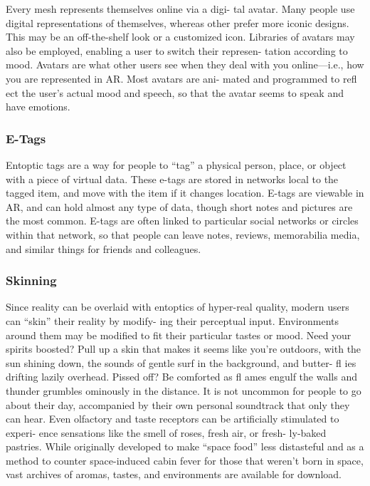 Every mesh represents themselves online via a digi-
tal avatar. Many people use digital representations 
of themselves, whereas other prefer more iconic 
designs. This may be an off-the-shelf look or a 
customized icon. Libraries of avatars may also be 
employed, enabling a user to switch their represen-
tation according to mood. Avatars are what other 
users see when they deal with you online—i.e., how 
you are represented in AR. Most avatars are ani-
mated and programmed to refl ect the user's actual 
mood and speech, so that the avatar seems to speak 
and have emotions.

\subsubsection{E-Tags}

Entoptic tags are a way for people to ``tag'' a physical 
person, place, or object with a piece of virtual data. 
These e-tags are stored in networks local to the tagged 
item, and move with the item if it changes location. 
E-tags are viewable in AR, and can hold almost any 
type of data, though short notes and pictures are the 
most common. E-tags are often linked to particular 
social networks or circles within that network, so that 
people can leave notes, reviews, memorabilia media, 
and similar things for friends and colleagues.

\subsubsection{Skinning}

Since reality can be overlaid with entoptics of hyper-real 
quality, modern users can ``skin'' their reality by modify-
ing their perceptual input. Environments around them 
may be modified to fit their particular tastes or mood. 
Need your spirits boosted? Pull up a skin that makes it 
seems like you're outdoors, with the sun shining down, 
the sounds of gentle surf in the background, and butter-
fl ies drifting lazily overhead. Pissed off? Be comforted as 
fl ames engulf the walls and thunder grumbles ominously 
in the distance. It is not uncommon for people to go 
about their day, accompanied by their own personal 
soundtrack that only they can hear. Even olfactory and 
taste receptors can be artificially stimulated to experi-
ence sensations like the smell of roses, fresh air, or fresh-
ly-baked pastries. While originally developed to make 
``space food'' less distasteful and as a method to counter 
space-induced cabin fever for those that weren't born in 
space, vast archives of aromas, tastes, and environments 
are available for download.

